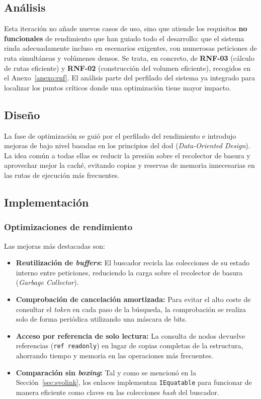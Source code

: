 \subsection{Análisis}

Esta iteración no añade nuevos casos de uso, sino que atiende los requisitos \textbf{no funcionales} de rendimiento que han guiado todo el desarrollo: que el sistema rinda adecuadamente incluso en escenarios exigentes, con numerosas peticiones de ruta simultáneas y volúmenes densos.
Se trata, en concreto, de \textbf{RNF-03} (cálculo de rutas eficiente) y \textbf{RNF-02} (construcción del volumen eficiente), recogidos en el Anexo~\ref{anexo:rnf}.
El análisis parte del perfilado del sistema ya integrado para localizar los puntos críticos donde una optimización tiene mayor impacto.

\subsection{Diseño}

La fase de optimización se guió por el perfilado del rendimiento e introdujo mejoras de bajo nivel basadas en los principios del \acrshort{dod} (\textit{Data-Oriented Design}).
La idea común a todas ellas es reducir la presión sobre el recolector de basura y aprovechar mejor la caché, evitando copias y reservas de memoria innecesarias en las rutas de ejecución más frecuentes.

\subsection{Implementación}

\subsubsection{Optimizaciones de rendimiento}

Las mejoras más destacadas son:

\begin{itemize}
  \item \textbf{Reutilización de \textit{buffers}:} El buscador recicla las colecciones de su estado interno entre peticiones, reduciendo la carga sobre el recolector de basura (\textit{Garbage Collector}).
  \item \textbf{Comprobación de cancelación amortizada:} Para evitar el alto coste de consultar el \textit{token} en cada paso de la búsqueda, la comprobación se realiza solo de forma periódica utilizando una máscara de bits.
  \item \textbf{Acceso por referencia de solo lectura:} La consulta de nodos devuelve referencias (\texttt{ref readonly}) en lugar de copias completas de la estructura, ahorrando tiempo y memoria en las operaciones más frecuentes.
  \item \textbf{Comparación sin \textit{boxing}:} Tal y como se mencionó en la Sección~\ref{sec:svolink}, los enlaces implementan \texttt{IEquatable} para funcionar de manera eficiente como claves en las colecciones \textit{hash} del buscador.
\end{itemize}


